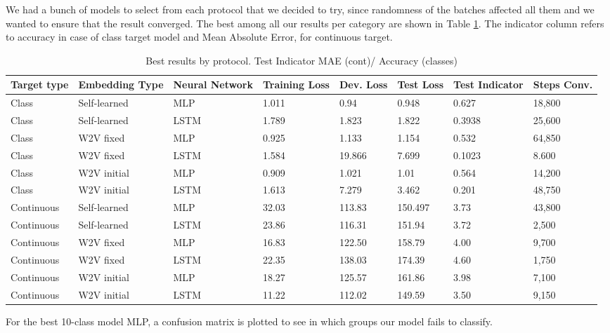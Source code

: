 \documentclass[11pt,letterpaper]{article}
\begin{document}
We had a bunch of models to select from each protocol that we decided to try, since randomness of the batches affected all them and we wanted to ensure that the result converged. The best among all our results per category are shown in Table \ref{table:summary-results}.  The indicator column refers to accuracy in case of class target model and Mean Absolute Error, for continuous target.

\begin{table}[htp!]
\centering
\caption{Best results by protocol. Test Indicator MAE (cont)/ Accuracy (classes)}
\label{table:summary-results}
\scalebox{0.8} 
{\begin{tabular}{|l|l|l|l|l|l|l|l|}
\hline
\textbf{Target type} & \textbf{Embedding Type} & \textbf{Neural Network} & \textbf{Training Loss} & \textbf{Dev. Loss} & \textbf{Test Loss} & \textbf{Test Indicator}  &\textbf{Steps Conv.} \\ \hline\hline
Class & Self-learned & MLP &1.011&	0.94&	0.948&0.627  & 18,800\\ \hline
Class & Self-learned & LSTM & 1.789&	1.823&	1.822&0.3938& 25,600 \\ \hline
Class & W2V fixed & MLP &0.925&	1.133&	1.154&0.532& 64,850 \\ \hline
Class & W2V fixed & LSTM & 1.584&	19.866&	7.699&0.1023& 8.600 \\ \hline
Class & W2V initial & MLP & 0.909&	1.021&	1.01&0.564&  14,200 \\ \hline
Class & W2V initial & LSTM & 1.613&	7.279&	3.462& 0.201 & 48,750\\ \hline
Continuous & Self-learned & MLP &32.03 &   113.83 & 150.497& 3.73 & 43,800\\ \hline
Continuous & Self-learned & LSTM & 23.86 &116.31    & 151.94 & 3.72& 2,500 \\ \hline
Continuous & W2V fixed & MLP & 16.83 & 122.50 &158.79    & 4.00 & 9,700\\ \hline
Continuous & W2V fixed & LSTM & 22.35 & 138.03   &174.39  & 4.60&1,750  \\ \hline
Continuous & W2V initial & MLP & 18.27 & 125.57 &161.86    & 3.98 & 7,100\\ \hline
Continuous & W2V initial & LSTM & 11.22 &112.02& 149.59 & 3.50 &9,150 \\ \hline \hline
\end{tabular}}
\end{table}

For the best 10-class model MLP, a confusion matrix is plotted to see in which groups our model fails to classify. 
\end{document}
